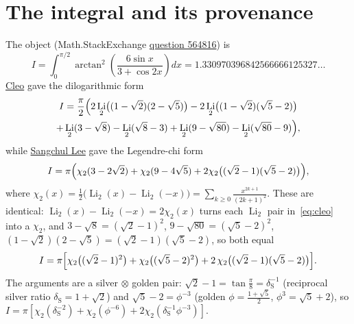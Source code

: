 \documentclass[11pt]{article}
\DeclareMathOperator{\Li}{Li}
\newcommand{\chitwo}{\chi_{2}}
\newcommand{\dS}{\delta_{\mathrm S}}
\theoremstyle{plain}\newtheorem{theorem}{Theorem}\newtheorem{proposition}[theorem]{Proposition}
\theoremstyle{remark}\newtheorem{remark}[theorem]{Remark}
\begin{document}
\section{The integral and its provenance}
The object (Math.StackExchange \href{https://math.stackexchange.com/q/564816}{question 564816}) is
\begin{equation}\label{eq:I}
  I=\int_0^{\pi/2}\arctan^2\!\left(\frac{6\sin x}{3+\cos2x}\right)dx=1.330970396842566666125327\ldots
\end{equation}
\href{https://math.stackexchange.com/a/570815}{Cleo} gave the dilogarithmic form
\begin{multline}\label{eq:cleo}
  I=\frac{\pi}{2}\Bigl(2\Li_2\bigl((1-\sqrt2)(2-\sqrt5)\bigr)-2\Li_2\bigl((1-\sqrt2)(\sqrt5-2)\bigr)\\
  +\Li_2(3-\sqrt8)-\Li_2(\sqrt8-3)+\Li_2(9-\sqrt{80})-\Li_2(\sqrt{80}-9)\Bigr),
\end{multline}
while \href{https://math.stackexchange.com/a/571079}{Sangchul Lee} gave the Legendre-chi form
\begin{equation}\label{eq:lee}
  I=\pi\Bigl(\chitwo(3-2\sqrt2)+\chitwo(9-4\sqrt5)+2\chitwo\bigl((\sqrt2-1)(\sqrt5-2)\bigr)\Bigr),
\end{equation}
where $\chitwo(x)=\tfrac12\bigl(\Li_2(x)-\Li_2(-x)\bigr)=\sum_{k\ge0}\frac{x^{2k+1}}{(2k+1)^2}$. These are
identical: $\Li_2(x)-\Li_2(-x)=2\chitwo(x)$ turns each $\Li_2$ pair in~\eqref{eq:cleo} into a $\chitwo$, and
$3-\sqrt8=(\sqrt2-1)^2$, $9-\sqrt{80}=(\sqrt5-2)^2$, $(1-\sqrt2)(2-\sqrt5)=(\sqrt2-1)(\sqrt5-2)$, so both
equal
\begin{equation}\label{eq:canon}
  I=\pi\Bigl[\chitwo\bigl((\sqrt2-1)^2\bigr)+\chitwo\bigl((\sqrt5-2)^2\bigr)
  +2\,\chitwo\bigl((\sqrt2-1)(\sqrt5-2)\bigr)\Bigr].
\end{equation}
The arguments are a silver$\,\otimes\,$golden pair: $\sqrt2-1=\tan\frac\pi8=\dS^{-1}$ (reciprocal silver
ratio $\dS=1+\sqrt2$) and $\sqrt5-2=\phi^{-3}$ (golden $\phi=\tfrac{1+\sqrt5}2$, $\phi^3=\sqrt5+2$), so
$I=\pi[\chitwo(\dS^{-2})+\chitwo(\phi^{-6})+2\chitwo(\dS^{-1}\phi^{-3})]$.
\end{document}
